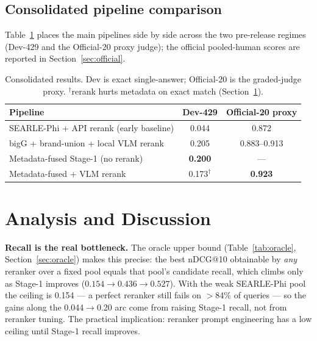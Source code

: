 \documentclass[sigconf,nonacm]{acmart}
\begin{document}
\subsection{Consolidated pipeline comparison}
Table~\ref{tab:consolidated} places the main pipelines side by side across the
two pre-release regimes (Dev-429 and the Official-20 proxy judge); the official
pooled-human scores are reported in Section~\ref{sec:official}.

\begin{table}[t]
\centering\small
\caption{Consolidated results. Dev is exact single-answer; Official-20 is
the graded-judge proxy. $^{\dagger}$rerank hurts metadata on exact match
(Section~\ref{sec:analysis}).}
\label{tab:consolidated}
\begin{tabular}{@{}lcc@{}}
\toprule
Pipeline & Dev-429 & Official-20 proxy \\
\midrule
SEARLE-Phi + API rerank (early baseline) & 0.044 & 0.872 \\
bigG + brand-union + local VLM rerank & 0.205 & 0.883--0.913 \\
Metadata-fused Stage-1 (no rerank) & \textbf{0.200} & --- \\
Metadata-fused + VLM rerank & 0.173$^{\dagger}$ & \textbf{0.923} \\
\bottomrule
\end{tabular}
\end{table}

\section{Analysis and Discussion}
\label{sec:analysis}
\textbf{Recall is the real bottleneck.} The oracle upper bound
(Table~\ref{tab:oracle}, Section~\ref{sec:oracle}) makes this precise: the
best nDCG@10 obtainable by \emph{any} reranker over a fixed pool equals that
pool's candidate recall, which climbs only as Stage-1 improves
($0.154\to0.436\to0.527$). With the weak SEARLE-Phi pool the ceiling is
0.154 --- a perfect reranker still fails on $>$84\% of queries --- so the
gains along the 0.044$\to$0.20 arc come from raising Stage-1 recall, not from
reranker tuning. The practical implication: reranker prompt engineering has a
low ceiling until Stage-1 recall improves.
\end{document}

